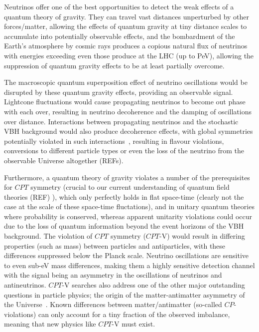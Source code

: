 \documentclass[a4paper,11pt]{article}
\newcounter{bar}
\begin{document}
Neutrinos offer one of the best opportunities to detect the weak effects of a quantum theory of gravity. They can travel vast distances unperturbed by other forces/matter, allowing the effects of quantum gravity at tiny distance scales to accumulate into potentially observable effects, and the bombardment of the Earth's atmosphere by cosmic rays produces a copious natural flux of neutrinos with energies exceeding even those produce at the LHC (up to PeV), allowing the suppression of quantum gravity effects to be at least partially overcome. 

The macroscopic quantum superposition effect of neutrino oscillations would be disrupted by these quantum gravity effects, providing an observable signal. Lightcone fluctuations would cause propagating neutrinos to become out phase with each over, resulting in neutrino decoherence and the damping of oscillations over distance. Interactions between propagating neutrinos and the stochastic VBH background would also produce decoherence effects, with global symmetries potentially violated in such interactions~\cite{Anchordoqui:2005gj, PhysRevD.102.115003, Hellmann:2021jyz}, resulting in flavour violations, conversions to different particle types or even the loss of the neutrino from the observable Universe altogether (REFs).

Furthermore, a quantum theory of gravity violates a number of the prerequisites for $CPT$ symmetry (crucial to our current understanding of quantum field theories (REF) ), which only perfectly holds in flat space-time (clearly not the case at the scale of these space-time fluctations), and in unitary quantum theories where probability is conserved, whereas apparent unitarity violations could occur due to the loss of quantum information beyond the event horizons of the VBH background. The violation of $CPT$ symmetry ($CPT$-V) would result in differing properties (such as mass) between particles and antiparticles, with these differences suppressed below the Planck scale. Neutrino oscillations are sensitive to even sub-eV mass differences, making them a highly sensitive detection channel with the signal being an asymmetry in the oscillations of neutrinos and antineutrinos. $CPT$-V searches also address one of the other major outstanding questions in particle physics; the origin of the matter-antimatter asymmetry of the Universe~\cite{Sakharov_1991}. Known differences between matter/antimatter (so-called $CP$-violations) can only account for a tiny fraction of the observed imbalance, meaning that new physics like $CPT$-V must exist. \\
\end{document}
